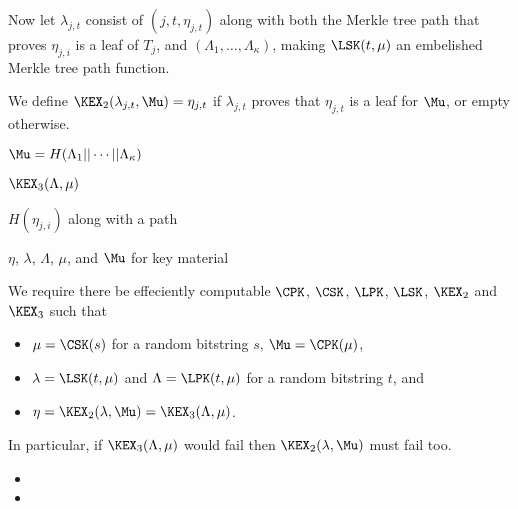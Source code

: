 \documentclass{llncs}
\begin{document}
Now let $\lambda_{j,t}$ consist of $(j,t,\eta_{j,t})$ along with
both the Merkle tree path that proves $\eta_{j,i}$ is a leaf of $T_j$,
and $(\Lambda_1,\ldots,\Lambda_\kappa)$,
 making $\LSK(t,\mu)$ an embelished Merkle tree path function.

We define $\KEX_2(\lambda_{j,t},\Mu) = \eta_{j,t}$
 if $\lambda_{j,t}$ proves that $\eta_{j,t}$ is a leaf for $\Mu$,
or empty otherwise.


$\Mu = H(\Lambda_1 || \cdots || \Lambda_\kappa)$

$\KEX_3(\Lambda,\mu)$



$H(\eta_{j,i})$ along with a path 

$\eta$, $\lambda$, $\Lambda$, $\mu$, and $\Mu$ for key material 


We require there be effeciently computable
  $\CPK$, $\CSK$, $\LPK$, $\LSK$, $\KEX_2$ and $\KEX_3$  such that 
\begin{itemize}
\item  $\mu = \CSK(s)$ for a random bitstring $s$,
       $\Mu = \CPK(\mu)$,
\item  $\lambda = \LSK(t,\mu)$ and $\Lambda = \LPK(t,\mu)$
       for a random bitstring $t$, and
\item $\eta = \KEX_2(\lambda,\Mu) = \KEX_3(\Lambda,\mu)$.
\end{itemize}
In particular, if $\KEX_3(\Lambda,\mu)$ would fail
 then $\KEX_2(\lambda,\Mu)$ must fail too.

\begin{itemize}
\item 
\item 
\end{itemize}






\end{document}

